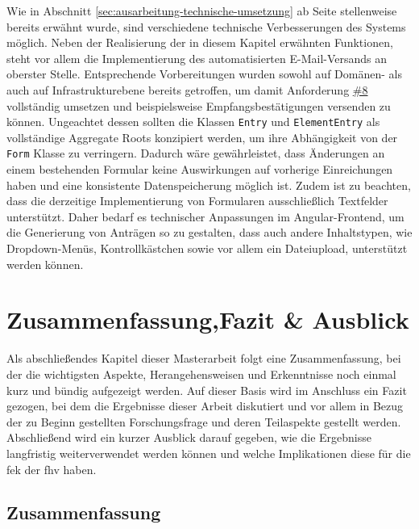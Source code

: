 \documentclass[a4paper,12pt,twoside]{scrreprt}
\begin{document}
Wie in Abschnitt \ref{sec:ausarbeitung-technische-umsetzung} ab Seite \pageref{sec:ausarbeitung-technische-umsetzung} stellenweise bereits erwähnt wurde, sind verschiedene technische Verbesserungen des Systems möglich. Neben der Realisierung der in diesem Kapitel erwähnten Funktionen, steht vor allem die Implementierung des automatisierten E-Mail-Versands an oberster Stelle. Entsprechende Vorbereitungen wurden sowohl auf Domänen- als auch auf Infrastrukturebene bereits getroffen, um damit Anforderung \hyperref[sub-sub-sec:abgeleitete-anforderungen-nach-einreichung]{\#8} vollständig umsetzen und beispielsweise Empfangsbestätigungen versenden zu können. Ungeachtet dessen sollten die Klassen \texttt{Entry} und \texttt{ElementEntry} als vollständige Aggregate Roots konzipiert werden, um ihre Abhängigkeit von der \texttt{Form} Klasse zu verringern. Dadurch wäre gewährleistet, dass Änderungen an einem bestehenden Formular keine Auswirkungen auf vorherige Einreichungen haben und eine konsistente Datenspeicherung möglich ist. Zudem ist zu beachten, dass die derzeitige Implementierung von Formularen ausschließlich Textfelder unterstützt. Daher bedarf es technischer Anpassungen im Angular-Frontend, um die Generierung von Anträgen so zu gestalten, dass auch andere Inhaltstypen, wie Dropdown-Menüs, Kontrollkästchen sowie vor allem ein Dateiupload, unterstützt werden können.

\cleardoublepage
\chapter[Zusammenfassung, Fazit \& Ausblick]{Zusammenfassung,\newline Fazit \& Ausblick}
\label{chap:zusammenfassung-Fazit-ausblick}

Als abschließendes Kapitel dieser Masterarbeit folgt eine Zusammenfassung, bei der die wichtigsten Aspekte, Herangehensweisen und Erkenntnisse noch einmal kurz und bündig aufgezeigt werden. Auf dieser Basis wird im Anschluss ein Fazit gezogen, bei dem die Ergebnisse dieser Arbeit diskutiert und vor allem in Bezug der zu Beginn gestellten Forschungsfrage und deren Teilaspekte gestellt werden. Abschließend wird ein kurzer Ausblick darauf gegeben, wie die Ergebnisse langfristig weiterverwendet werden können und welche Implikationen diese für die \acl{fek} der \acl{fhv} haben.

\section{Zusammenfassung}
\label{sec:zuammenfassung}
\end{document}
